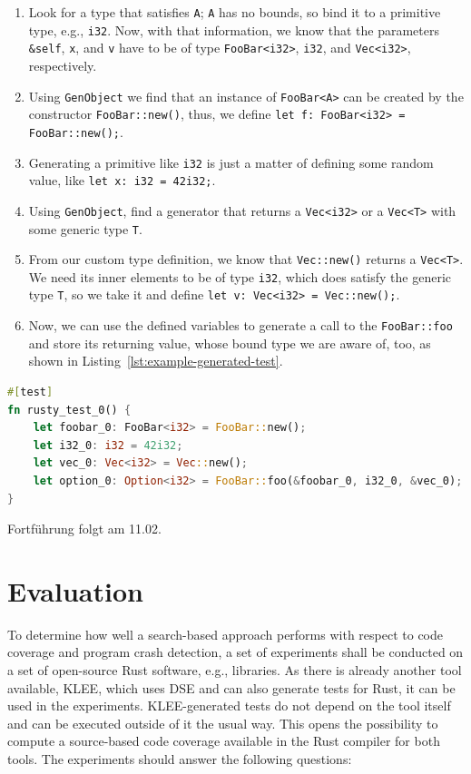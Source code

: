 \documentclass{article}
\begin{document}
\begin{enumerate}
    \item Look for a type that satisfies \lstinline{A}; \lstinline{A} has no bounds, so bind it to a primitive type, e.g., \lstinline{i32}. Now, with that information, we know that the parameters \lstinline{&self}, \lstinline{x}, and \lstinline{v} have to be of type \lstinline{FooBar<i32>}, \lstinline{i32}, and \lstinline{Vec<i32>}, respectively.
    \item Using \lstinline{GenObject} we find that an instance of \lstinline{FooBar<A>} can be created by the constructor \lstinline{FooBar::new()}, thus, we define \lstinline{let f: FooBar<i32> = FooBar::new();}.
    \item Generating a primitive like \lstinline{i32} is just a matter of defining some random value, like \lstinline{let x: i32 = 42i32;}.
    \item Using \lstinline{GenObject}, find a generator that returns a \lstinline{Vec<i32>} or a \lstinline{Vec<T>} with some generic type \lstinline{T}.
    \item From our custom type definition, we know that \lstinline{Vec::new()} returns a \lstinline{Vec<T>}. We need its inner elements to be of type \lstinline{i32}, which does satisfy the generic type \lstinline{T}, so we take it and define \lstinline{let v: Vec<i32> = Vec::new();}.
    \item Now, we can use the defined variables to generate a call to the \lstinline{FooBar::foo} and store its returning value, whose bound type we are aware of, too, as shown in Listing~\ref{lst:example-generated-test}.
\end{enumerate}

\begin{lstlisting}[language=Rust, style=boxed, caption={An example test that invokes \lstinline{FooBar::foo}}, label=lst:example-generated-test]
#[test]
fn rusty_test_0() {
    let foobar_0: FooBar<i32> = FooBar::new();
    let i32_0: i32 = 42i32;
    let vec_0: Vec<i32> = Vec::new();
    let option_0: Option<i32> = FooBar::foo(&foobar_0, i32_0, &vec_0);
}
\end{lstlisting}

Fortführung folgt am 11.02.

\newpage
\section{Evaluation}
To determine how well a search-based approach performs with respect to code coverage and program crash detection, a set of experiments shall be conducted on a set of open-source Rust software, e.g., libraries. As there is already another tool available, KLEE, which uses \ac{DSE} and can also generate tests for Rust, it can be used in the experiments. KLEE-generated tests do not depend on the tool itself and can be executed outside of it the usual way. This opens the possibility to compute a source-based code coverage available in the Rust compiler for both tools. The experiments should answer the following questions:
\end{document}
